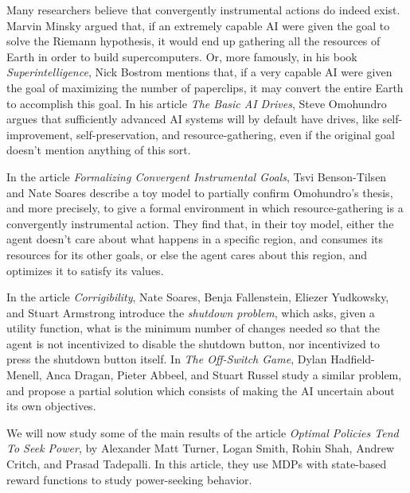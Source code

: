\documentclass{article}
\theoremstyle{definition}
\theoremstyle{remark}
\theoremstyle{example}
\begin{document}
Many researchers believe that convergently instrumental actions do indeed exist. Marvin Minsky argued that, if an extremely capable AI were given the goal to solve the Riemann hypothesis, it would end up gathering all the resources of Earth in order to build supercomputers. Or, more famously, in his book \textit{Superintelligence}, Nick Bostrom mentions that, if a very capable AI were given the goal of maximizing the number of paperclips, it may convert the entire Earth to accomplish this goal. In his article \textit{The Basic AI Drives}, Steve Omohundro argues that sufficiently advanced AI systems will by default have drives, like self-improvement, self-preservation, and resource-gathering, even if the original goal doesn't mention anything of this sort.

In the article \textit{Formalizing Convergent Instrumental Goals}, Tsvi Benson-Tilsen and Nate Soares describe a toy model to partially confirm Omohundro's thesis, and more precisely, to give a formal environment in which resource-gathering is a convergently instrumental action. They find that, in their toy model, either the agent doesn't care about what happens in a specific region, and consumes its resources for its other goals, or else the agent cares about this region, and optimizes it to satisfy its values.

In the article \textit{Corrigibility}, Nate Soares, Benja Fallenstein, Eliezer Yudkowsky, and Stuart Armstrong introduce the \textit{shutdown problem}, which asks, given a utility function, what is the minimum number of changes needed so that the agent is not incentivized to disable the shutdown button, nor incentivized to press the shutdown button itself. In \textit{The Off-Switch Game}, Dylan Hadfield-Menell, Anca Dragan, Pieter Abbeel, and Stuart Russel study a similar problem, and propose a partial solution which consists of making the AI uncertain about its own objectives.

We will now study some of the main results of the article \textit{Optimal Policies Tend To Seek Power}, by Alexander Matt Turner, Logan Smith, Rohin Shah, Andrew Critch, and Prasad Tadepalli. In this article, they use MDPs with state-based reward functions to study power-seeking behavior.


\end{document}
